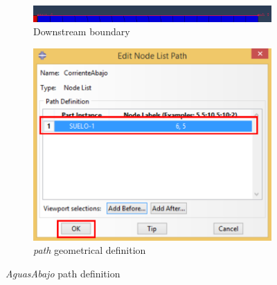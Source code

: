 \begin{itemize}
\begin{figure}[!h]
    \begin{subfigure}[!h]{0.60\textwidth}
      \includegraphics[width=\textwidth]{./body/images/post09}
      \caption{Downstream boundary}
      \label{post09}
    \end{subfigure}%
    \begin{subfigure}[!h]{0.40\textwidth}
      \includegraphics[width=\textwidth]{./body/images/post10.pdf}
      \caption{\textit{path} geometrical definition}
      \label{post10}
    \end{subfigure}%
    \caption{\textit{AguasAbajo} path definition}
  \end{figure}


\end{itemize}
